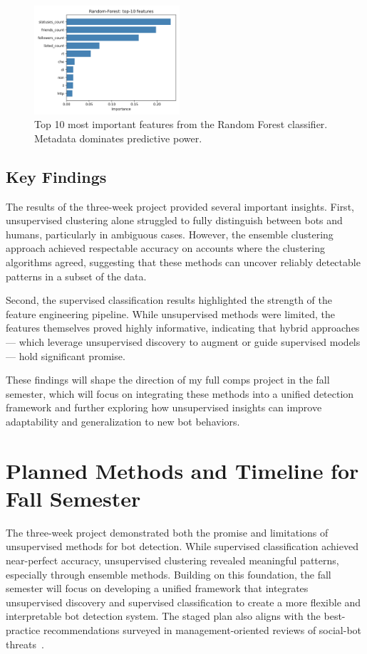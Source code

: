 \documentclass[10pt,twocolumn]{article}
\begin{document}
\begin{figure}[ht]
    \centering
    \includegraphics[width=0.48\textwidth]{rf_feature_importance.png}
    \caption{Top 10 most important features from the Random Forest classifier. Metadata dominates predictive power.}
    \label{fig:rf_importance}
\end{figure}

\subsection{Key Findings}

The results of the three-week project provided several important insights. First, unsupervised clustering alone struggled to fully distinguish between bots and humans, particularly in ambiguous cases. However, the ensemble clustering approach achieved respectable accuracy on accounts where the clustering algorithms agreed, suggesting that these methods can uncover reliably detectable patterns in a subset of the data.

Second, the supervised classification results highlighted the strength of the feature engineering pipeline. While unsupervised methods were limited, the features themselves proved highly informative, indicating that hybrid approaches — which leverage unsupervised discovery to augment or guide supervised models — hold significant promise.

These findings will shape the direction of my full comps project in the fall semester, which will focus on integrating these methods into a unified detection framework and further exploring how unsupervised insights can improve adaptability and generalization to new bot behaviors.

\section{Planned Methods and Timeline for Fall Semester}

The three-week project demonstrated both the promise and limitations of unsupervised methods for bot detection. While supervised classification achieved near-perfect accuracy, unsupervised clustering revealed meaningful patterns, especially through ensemble methods. Building on this foundation, the fall semester will focus on developing a unified framework that integrates unsupervised discovery and supervised classification to create a more flexible and interpretable bot detection system. The staged plan also aligns with the best-practice recommendations surveyed in management-oriented reviews of social-bot threats~\cite{Hajli2021social}.
\end{document}
